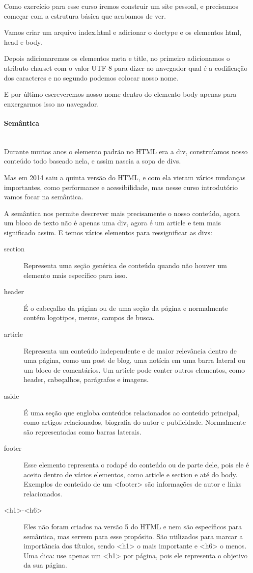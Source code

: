 \documentclass[12pt,a4paper]{article}
\begin{document}
	Como exercício para esse curso iremos construir um site pessoal, e precisamos começar com a estrutura básica que acabamos de ver.
	
	Vamos criar um arquivo index.html e adicionar o doctype e os elementos html, head e body.
	
	Depois adicionaremos os elementos meta e title, no primeiro adicionamos o atributo charset com o valor UTF-8 para dizer ao navegador qual é a codificação dos caracteres e no segundo podemos colocar nosso nome.
	
	E por último escreveremos nosso nome dentro do elemento body apenas para enxergarmos isso no navegador.
	
	\paragraph{Semântica} \mbox{} \\
	
	Durante muitos anos o elemento padrão no HTML era a div, construíamos nosso conteúdo todo baseado nela, e assim nascia a sopa de divs.
	
	Mas em 2014 saiu a quinta versão do HTML, e com ela vieram vários mudanças importantes, como performance e acessibilidade, mas nesse curso introdutório vamos focar na semântica.
	
	A semântica nos permite descrever mais precisamente o nosso conteúdo, agora um bloco de texto não é apenas uma div, agora é um article e tem mais significado assim. E temos vários elementos para ressignificar as divs:
	
	\begin{description}
		\item[section] Representa uma seção genérica de conteúdo quando não houver um elemento mais específico para isso.
		\item[header] É o cabeçalho da página ou de uma seção da página e normalmente contém logotipos, menus, campos de busca.
		\item[article] Representa um conteúdo independente e de maior relevância dentro de uma página, como um post de blog, uma notícia em uma barra lateral ou um bloco de comentários. Um article pode conter outros elementos, como header, cabeçalhos, parágrafos e imagens.
		\item[aside] É uma seção que engloba conteúdos relacionados ao conteúdo principal, como artigos relacionados, biografia do autor e publicidade. Normalmente são representadas como barras laterais.
		\item[footer] Esse elemento representa o rodapé do conteúdo ou de parte dele, pois ele é aceito dentro de vários elementos, como article e section e até do body. Exemplos de conteúdo de um <footer> são informações de autor e links relacionados.
		\item[<h1>-<h6>] Eles não foram criados na versão 5 do HTML e nem são específicos para semântica, mas servem para esse propósito. São utilizados para marcar a importância dos títulos, sendo <h1> o mais importante e <h6> o menos. Uma dica: use apenas um <h1> por página, pois ele representa o objetivo da sua página.
	\end{description}
	
\end{document}
